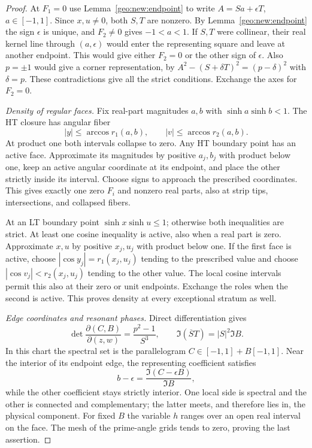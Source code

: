 \documentclass[11pt]{article}
\numberwithin{equation}{section}
\theoremstyle{definition}
\begin{document}
\begin{proof}
At $F_1=0$ use Lemma~\ref{geo:new:endpoint} to write
$A=Sa+\epsilon T$, $a\in[-1,1]$.  Since $x,u\ne0$, both $S,T$ are nonzero. By
Lemma~\ref{geo:new:endpoint} the sign $\epsilon$ is unique, and
$F_2\ne0$ gives $-1<a<1$. If $S,T$ were collinear, their real
kernel line through $(a,\epsilon)$ would enter the representing
square and leave at another endpoint. This would give either
$F_2=0$ or the other sign of $\epsilon$. Also $p=\pm1$ would give
a corner representation, by $A^2-(S+\delta T)^2=(p-\delta)^2$
with $\delta=p$. These contradictions give all the strict conditions.
Exchange the axes for $F_2=0$.

\emph{Density of regular faces.}
Fix real-part magnitudes $a,b$ with
$\sinh a\sinh b<1$.  The HT closure has angular fiber
\[
 |y|\leq\arccos r_1(a,b),\qquad
 |v|\leq\arccos r_2(a,b).
\]
At product one both intervals collapse to zero.  Any HT boundary
point has an active face.  Approximate its magnitudes by positive
$a_j,b_j$ with product below one, keep an active angular coordinate
at its endpoint, and place the other strictly inside its interval.
Choose signs to approach the prescribed coordinates.  This gives
exactly one zero $F_i$ and nonzero real parts, also at strip tips,
intersections, and collapsed fibers.

At an LT boundary point $\sinh x\sinh u\leq1$; otherwise both
inequalities are strict.  At least one cosine inequality is active,
also when a real part is zero.  Approximate $x,u$ by positive
$x_j,u_j$ with product below one.  If the first face is active,
choose $|\cos y_j|=r_1(x_j,u_j)$ tending to the prescribed value
and choose $|\cos v_j|<r_2(x_j,u_j)$ tending to the other value.
The local cosine intervals permit this also at their zero or
unit endpoints.  Exchange the roles when the second is active.
This proves density at every exceptional stratum as well.

\emph{Edge coordinates and resonant phases.}
Direct differentiation gives
\[
 \det\frac{\partial(C,B)}{\partial(z,w)}=\frac{p^2-1}{S^3},
 \qquad \Im(\overline S T)=|S|^2\Im B.
\]
In this chart the spectral set is the parallelogram
$C\in[-1,1]+B[-1,1]$.  Near the interior of its endpoint
edge, the representing coefficient satisfies
\[
 b-\epsilon=\frac{\Im(C-\epsilon B)}{\Im B},
\]
while the other coefficient stays strictly interior.  One local
side is spectral and the other is connected and complementary;
the latter meets, and therefore lies in, the physical component.
For fixed $B$ the variable $h$ ranges over an open real interval
on the face.  The mesh of the prime-angle grids tends to zero,
proving the last assertion.
\end{proof}
\end{document}
